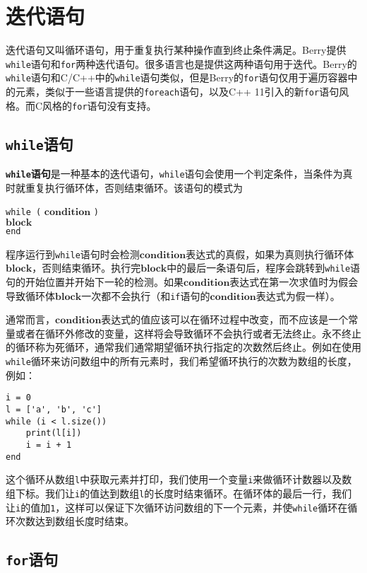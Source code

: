 \section{迭代语句}

迭代语句又叫循环语句，用于重复执行某种操作直到终止条件满足。Berry提供\texttt{while}语句和\texttt{for}两种迭代语句。很多语言也是提供这两种语句用于迭代。Berry的\texttt{while}语句和C/C++中的\texttt{while}语句类似，但是Berry的\texttt{for}语句仅用于遍历容器中的元素，类似于一些语言提供的\texttt{foreach}语句，以及C++ 11引入的新\texttt{for}语句风格。而C风格的\texttt{for}语句没有支持。

\subsection{\texttt{while}语句}

\textbf{\texttt{while}语句}是一种基本的迭代语句，\texttt{while}语句会使用一个判定条件，当条件为真时就重复执行循环体，否则结束循环。该语句的模式为
\begin{algorithm}
    \texttt{while (} $\bm{condition}$ \texttt{)} \\
        \qquad $\bm{block}$ \\
    \texttt{end}
\end{algorithm}
程序运行到\texttt{while}语句时会检测$\bm{condition}$表达式的真假，如果为真则执行循环体$\bm{block}$，否则结束循环。执行完$\bm{block}$中的最后一条语句后，程序会跳转到\texttt{while}语句的开始位置并开始下一轮的检测。如果$\bm{condition}$表达式在第一次求值时为假会导致循环体$\bm{block}$一次都不会执行（和\texttt{if}语句的$\bm{condition}$表达式为假一样）。

通常而言，$\bm{condition}$表达式的值应该可以在循环过程中改变，而不应该是一个常量或者在循环外修改的变量，这样将会导致循环不会执行或者无法终止。永不终止的循环称为死循环，通常我们通常期望循环执行指定的次数然后终止。例如在使用\texttt{while}循环来访问数组中的所有元素时，我们希望循环执行的次数为数组的长度，例如：
\begin{lstlisting}[language=berry, numbers=none]
i = 0
l = ['a', 'b', 'c']
while (i < l.size())
    print(l[i])
    i = i + 1
end
\end{lstlisting}
这个循环从数组\texttt{l}中获取元素并打印，我们使用一个变量\texttt{i}来做循环计数器以及数组下标。我们让\texttt{i}的值达到数组\texttt{l}的长度时结束循环。在循环体的最后一行，我们让\texttt{i}的值加\texttt{1}，这样可以保证下次循环访问数组的下一个元素，并使\texttt{while}循环在循环次数达到数组长度时结束。

\subsection{\texttt{for}语句}

